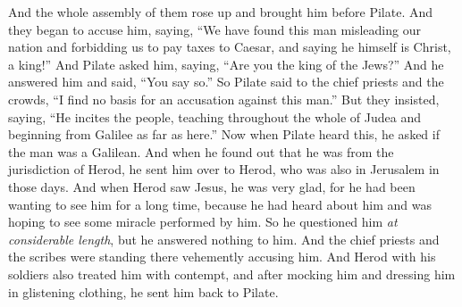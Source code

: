 \begin{biblechapter} %
 And the whole assembly of them rose up and brought him before Pilate.
\verse And they began to accuse him, saying, “We have found this man misleading our nation and forbidding us to pay taxes to Caesar, and saying he himself is Christ, a king!”
\verse And Pilate asked him, saying, “Are you the king of the Jews?” And he answered him and said, “You say so.”
\verse So Pilate said to the chief priests and the crowds, “I find no basis for an accusation against this man.”
\verse But they insisted, saying, “He incites the people, teaching throughout the whole of Judea and beginning from Galilee as far as here.”
 Now when Pilate heard this, he asked if the man was a Galilean.
\verse And when he found out that he was from the jurisdiction of Herod, he sent him over to Herod, who was also in Jerusalem in those days.
\verse And when Herod saw Jesus, he was very glad, for he had been wanting to see him for a long time, because he had heard about him and was hoping to see some miracle performed by him.
\verse So he questioned him \textit{at considerable length}, but he answered nothing to him.
\verse And the chief priests and the scribes were standing there vehemently accusing him.
\verse And Herod with his soldiers also treated him with contempt, and after mocking him and dressing him in glistening clothing, he sent him back to Pilate.

\end{biblechapter}
